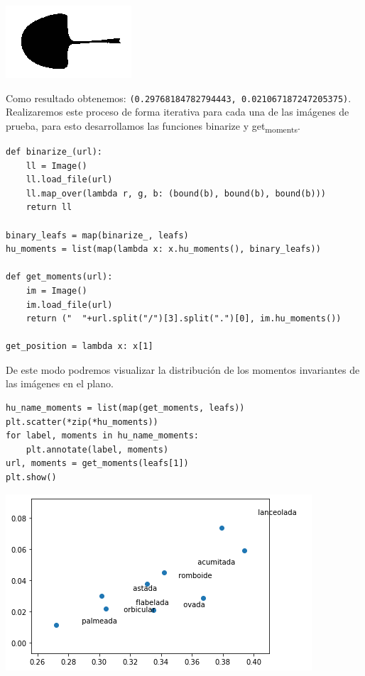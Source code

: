 \documentclass[letter]{article}
\begin{document}
\begin{center}
\includegraphics[width=.9\linewidth]{./images/showbn.png}
\end{center}

Como resultado obtenemos: \texttt{(0.29768184782794443, 0.021067187247205375)}.
Realizaremos este proceso de forma iterativa para cada una de las imágenes de
prueba, para esto desarrollamos las funciones  binarize y get\textsubscript{moments}.

\begin{verbatim}
def binarize_(url):
    ll = Image()
    ll.load_file(url)
    ll.map_over(lambda r, g, b: (bound(b), bound(b), bound(b)))
    return ll

binary_leafs = map(binarize_, leafs)
hu_moments = list(map(lambda x: x.hu_moments(), binary_leafs))

def get_moments(url):
    im = Image()
    im.load_file(url)
    return ("  "+url.split("/")[3].split(".")[0], im.hu_moments())

get_position = lambda x: x[1]
\end{verbatim}

De este modo podremos visualizar la distribución de los momentos invariantes de
las imágenes en el plano.

\begin{verbatim}
hu_name_moments = list(map(get_moments, leafs))
plt.scatter(*zip(*hu_moments))
for label, moments in hu_name_moments:
    plt.annotate(label, moments)
url, moments = get_moments(leafs[1])
plt.show()
\end{verbatim}

\begin{center}
\includegraphics[width=.9\linewidth]{./images/plano.png}
\end{center}
\end{document}
